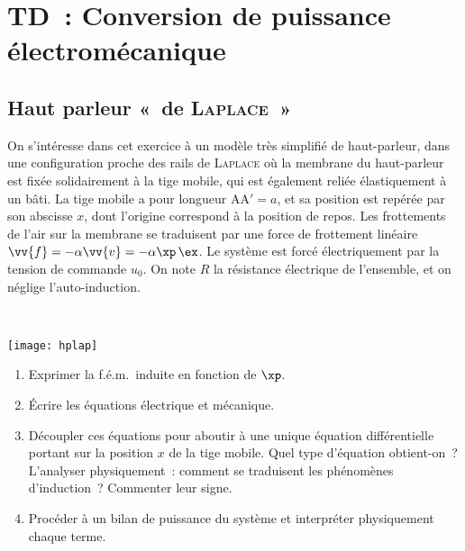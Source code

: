 \documentclass[a4paper, 10pt, final, garamond]{book}
\begin{document}
\setcounter{chapter}{3}

\chapter{TD~: Conversion de puissance électromécanique}

\section{Haut parleur «~de \textsc{Laplace}~»}
\label{sec:hplap}
\noindent
\begin{minipage}[t]{.65\linewidth}
	On s'intéresse dans cet exercice à un modèle très simplifié de haut-parleur,
	dans une configuration proche des rails de \textsc{Laplace} où la membrane du
	haut-parleur est fixée solidairement à la tige mobile, qui est également
	reliée élastiquement à un bâti. La tige mobile a pour longueur $\mathrm{AA'} =
		a$, et sa position est repérée par son abscisse $x$, dont l'origine correspond
	à la position de repos. Les frottements de l'air sur la membrane se traduisent
	par une force de frottement linéaire $\vv{f} = -\alpha \vv{v} = -\alpha \xp\,
		\ex$. Le système est forcé électriquement par la tension de commande $u_0$. On
	note $R$ la résistance électrique de l'ensemble, et on néglige
	l'auto-induction.
\end{minipage}
\hfill
\begin{minipage}[t]{.3\linewidth}
	~
	\vspace*{-20pt}
	\begin{center}
		\texttt{[image: hplap]}
		\label{fig:hplap}
	\end{center}
\end{minipage}
\begin{enumerate}
	\item Exprimer la f.é.m.\ induite en fonction de $\xp$.
	\item Écrire les équations électrique et mécanique.
	\item Découpler ces équations pour aboutir à une unique équation
	      différentielle portant sur la position $x$ de la tige mobile. Quel type
	      d'équation obtient-on~? L'analyser physiquement~: comment se traduisent
	      les phénomènes d'induction~? Commenter leur signe.
	\item Procéder à un bilan de puissance du système et interpréter physiquement
	      chaque terme.
\end{enumerate}
\end{document}
